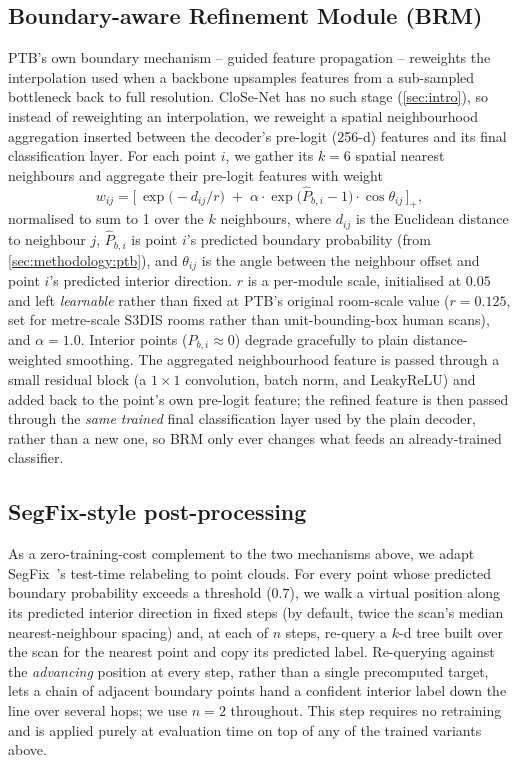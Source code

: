 \documentclass{article}
\theoremstyle{plain}
\theoremstyle{definition}
\theoremstyle{remark}
\begin{document}
\subsection{Boundary-aware Refinement Module (BRM)}
\label{sec:methodology:brm}

PTB's own boundary mechanism -- guided feature propagation -- reweights the
interpolation used when a backbone upsamples features from a sub-sampled
bottleneck back to full resolution. CloSe-Net has no such stage
(\cref{sec:intro}), so instead of reweighting an interpolation, we reweight a
spatial neighbourhood aggregation inserted between the decoder's pre-logit
(256-d) features and its final classification layer. For each point $i$, we
gather its $k{=}6$ spatial nearest neighbours and aggregate their pre-logit
features with weight
\begin{equation}
  w_{ij} = \Big[\, \exp\!\big(-d_{ij}/r\big) \;+\; \alpha \cdot \exp\!\big(\hat{P}_{b,i} - 1\big) \cdot \cos\theta_{ij} \,\Big]_{+},
  \label{eq:brm-weight}
\end{equation}
normalised to sum to 1 over the $k$ neighbours, where $d_{ij}$ is the
Euclidean distance to neighbour $j$, $\hat P_{b,i}$ is point $i$'s predicted
boundary probability (from \cref{sec:methodology:ptb}), and $\theta_{ij}$ is
the angle between the neighbour offset and point $i$'s predicted interior
direction. $r$ is a per-module scale, initialised at $0.05$ and left
\emph{learnable} rather than fixed at PTB's original room-scale value
($r{=}0.125$, set for metre-scale S3DIS rooms rather than unit-bounding-box
human scans), and $\alpha{=}1.0$. Interior points ($\hat P_{b,i}\approx0$)
degrade gracefully to plain distance-weighted smoothing. The aggregated
neighbourhood feature is passed through a small residual block (a
$1{\times}1$ convolution, batch norm, and LeakyReLU) and added back to the
point's own pre-logit feature; the refined feature is then passed through the
\emph{same trained} final classification layer used by the plain decoder,
rather than a new one, so BRM only ever changes what feeds an already-trained
classifier.

\subsection{SegFix-style post-processing}
\label{sec:methodology:segfix}

As a zero-training-cost complement to the two mechanisms above, we adapt
SegFix~\cite{yuan2020segfixmodelagnosticboundaryrefinement}'s test-time
relabeling to point clouds. For every point whose predicted boundary
probability exceeds a threshold ($0.7$), we walk a virtual position along its
predicted interior direction in fixed steps (by default, twice the scan's
median nearest-neighbour spacing) and, at each of $n$ steps, re-query a
$k$-d tree built over the scan for the nearest point and copy its predicted
label. Re-querying against the \emph{advancing} position at every step, rather
than a single precomputed target, lets a chain of adjacent boundary points
hand a confident interior label down the line over several hops; we use
$n{=}2$ throughout. This step requires no retraining and is applied purely at
evaluation time on top of any of the trained variants above.
\end{document}
